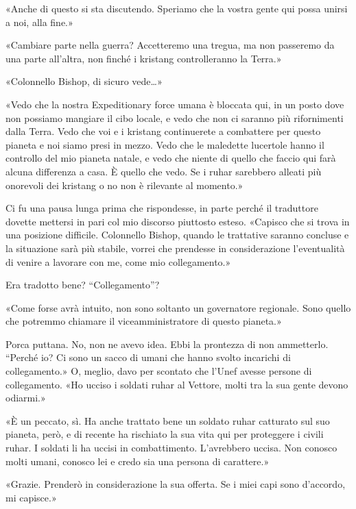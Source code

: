 «Anche di questo si sta discutendo. Speriamo che la vostra gente qui
possa unirsi a noi, alla fine.»

«Cambiare parte nella guerra? Accetteremo una tregua, ma non passeremo
da una parte all'altra, non finché i kristang controlleranno la Terra.»

«Colonnello Bishop, di sicuro vede\ldots»

«Vedo che la nostra Expeditionary force umana è bloccata qui, in un
posto dove non possiamo mangiare il cibo locale, e vedo che non ci
saranno più rifornimenti dalla Terra. Vedo che voi e i kristang
continuerete a combattere per questo pianeta e noi siamo presi in mezzo.
Vedo che le maledette lucertole hanno il controllo del mio pianeta
natale, e vedo che niente di quello che faccio qui farà alcuna
differenza a casa. È quello che vedo. Se i ruhar sarebbero alleati più
onorevoli dei kristang o no non è rilevante al momento.»

Ci fu una pausa lunga prima che rispondesse, in parte perché il
traduttore dovette mettersi in pari col mio discorso piuttosto esteso.
«Capisco che si trova in una posizione difficile. Colonnello Bishop,
quando le trattative saranno concluse e la situazione sarà più stabile,
vorrei che prendesse in considerazione l'eventualità di venire a
lavorare con me, come mio collegamento.»

Era tradotto bene? ``Collegamento''?

«Come forse avrà intuito, non sono soltanto un governatore regionale.
Sono quello che potremmo chiamare il viceamministratore di questo
pianeta.»

Porca puttana. No, non ne avevo idea. Ebbi la prontezza di non
ammetterlo. ``Perché io? Ci sono un sacco di umani che hanno svolto
incarichi di collegamento.» O, meglio, davo per scontato che l'Unef
avesse persone di collegamento. «Ho ucciso i soldati ruhar al Vettore,
molti tra la sua gente devono odiarmi.»

«È un peccato, sì. Ha anche trattato bene un soldato ruhar catturato sul
suo pianeta, però, e di recente ha rischiato la sua vita qui per
proteggere i civili ruhar. I soldati li ha uccisi in combattimento.
L'avrebbero uccisa. Non conosco molti umani, conosco lei e credo sia una
persona di carattere.»

«Grazie. Prenderò in considerazione la sua offerta. Se i miei capi sono
d'accordo, mi capisce.»